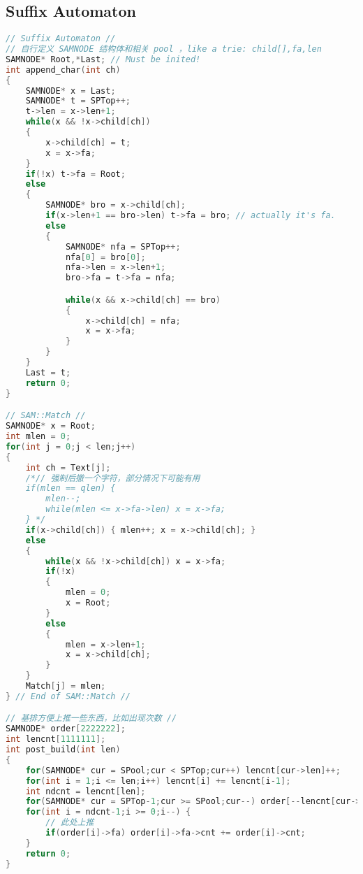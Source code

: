 \subsection{Suffix Automaton}
\begin{lstlisting}[language=C++]
// Suffix Automaton //
// 自行定义 SAMNODE 结构体和相关 pool ，like a trie: child[],fa,len
SAMNODE* Root,*Last; // Must be inited!
int append_char(int ch)
{
	SAMNODE* x = Last;
	SAMNODE* t = SPTop++;
	t->len = x->len+1;
	while(x && !x->child[ch])
	{
		x->child[ch] = t;
		x = x->fa;
	}
	if(!x) t->fa = Root;
	else
	{
		SAMNODE* bro = x->child[ch];
		if(x->len+1 == bro->len) t->fa = bro; // actually it's fa.
		else
		{
			SAMNODE* nfa = SPTop++;
			nfa[0] = bro[0];
			nfa->len = x->len+1;
			bro->fa = t->fa = nfa;

			while(x && x->child[ch] == bro)
			{
				x->child[ch] = nfa;
				x = x->fa;
			}
		}
	}
	Last = t;
	return 0;
}

// SAM::Match //
SAMNODE* x = Root;
int mlen = 0;
for(int j = 0;j < len;j++)
{
	int ch = Text[j];
	/*// 强制后撤一个字符，部分情况下可能有用
	if(mlen == qlen) {
		mlen--;
		while(mlen <= x->fa->len) x = x->fa;
	} */
	if(x->child[ch]) { mlen++; x = x->child[ch]; }
	else
	{
		while(x && !x->child[ch]) x = x->fa;
		if(!x)
		{
			mlen = 0;
			x = Root;
		}
		else
		{
			mlen = x->len+1;
			x = x->child[ch];
		}
	}
	Match[j] = mlen;
} // End of SAM::Match //

// 基排方便上推一些东西，比如出现次数 //
SAMNODE* order[2222222];
int lencnt[1111111];
int post_build(int len)
{
	for(SAMNODE* cur = SPool;cur < SPTop;cur++) lencnt[cur->len]++;
	for(int i = 1;i <= len;i++) lencnt[i] += lencnt[i-1];
	int ndcnt = lencnt[len];
	for(SAMNODE* cur = SPTop-1;cur >= SPool;cur--) order[--lencnt[cur->len]] = cur;
	for(int i = ndcnt-1;i >= 0;i--) {
		// 此处上推
		if(order[i]->fa) order[i]->fa->cnt += order[i]->cnt;
	}
	return 0;
}
\end{lstlisting}
